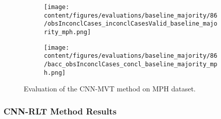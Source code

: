 

\begin{figure}[t]
  \begin{subfigure}{0.9\textwidth}
    \centering
    \texttt{[image: content/figures/evaluations/baseline\_majority/86/obsInconclCases\_inconclCasesValid\_baseline\_majority\_mph.png]}
    \label{fig:obsInconclCases_inconclCasesValid_baseline_majority_mph}
  \end{subfigure}
  \hfill
  \begin{subfigure}{0.9\textwidth}
    \centering
    \texttt{[image: content/figures/evaluations/baseline\_majority/86/bacc\_obsInconclCases\_concl\_baseline\_majority\_mph.png]}
    \label{fig:bacc_obsInconclCases_concl_baseline_majority_mph}
  \end{subfigure}
  \caption{Evaluation of the CNN-MVT method on MPH dataset.}
\end{figure}


\subsubsection{CNN-RLT Method Results}
\label{subsubsec:eval_rlt}





